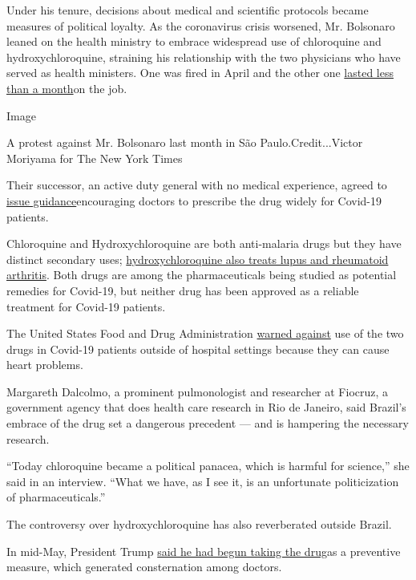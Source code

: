 Under his tenure, decisions about medical and scientific protocols
became measures of political loyalty. As the coronavirus crisis
worsened, Mr. Bolsonaro leaned on the health ministry to embrace
widespread use of chloroquine and hydroxychloroquine, straining his
relationship with the two physicians who have served as health
ministers. One was fired in April and the other one
\href{https://www.nytimes.com/2020/05/15/world/americas/brazil-health-minister-bolsonaro.html}{lasted
less than a month}on the job.

Image

A protest against Mr. Bolsonaro last month in São Paulo.Credit...Victor
Moriyama for The New York Times

Their successor, an active duty general with no medical experience,
agreed to
\href{https://www.saude.gov.br/noticias/agencia-saude/46919-ministerio-da-saude-divulga-diretrizes-para-tratamento-medicamentoso-de-pacientes}{issue
guidance}encouraging doctors to prescribe the drug widely for Covid-19
patients.

Chloroquine and Hydroxychloroquine are both anti-malaria drugs but they
have distinct secondary uses;
\href{https://www.nytimes.com/article/hydroxychloroquine-coronavirus.html}{hydroxychloroquine
also treats lupus and rheumatoid arthritis}. Both drugs are among the
pharmaceuticals being studied as potential remedies for Covid-19, but
neither drug has been approved as a reliable treatment for Covid-19
patients.

The United States Food and Drug Administration
\href{https://www.fda.gov/drugs/drug-safety-and-availability/fda-cautions-against-use-hydroxychloroquine-or-chloroquine-covid-19-outside-hospital-setting-or}{warned
against} use of the two drugs in Covid-19 patients outside of hospital
settings because they can cause heart problems.

Margareth Dalcolmo, a prominent pulmonologist and researcher at Fiocruz,
a government agency that does health care research in Rio de Janeiro,
said Brazil's embrace of the drug set a dangerous precedent --- and is
hampering the necessary research.

``Today chloroquine became a political panacea, which is harmful for
science,'' she said in an interview. ``What we have, as I see it, is an
unfortunate politicization of pharmaceuticals.''

The controversy over hydroxychloroquine has also reverberated outside
Brazil.

In mid-May, President Trump
\href{https://www.nytimes.com/2020/05/18/us/politics/trump-hydroxychloroquine-covid-coronavirus.html}{said
he had begun taking the drug}as a preventive measure, which generated
consternation among doctors.

